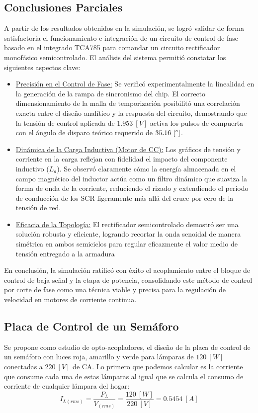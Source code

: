 \documentclass[12pt,a4paper]{article}
\begin{document}
\subsection{Conclusiones Parciales}
A partir de los resultados obtenidos en la simulación, se logró validar de forma satisfactoria el funcionamiento e integración de un circuito de control de fase basado en el integrado TCA785 para comandar un circuito rectificador monofásico semicontrolado. El análisis del sistema permitió constatar los siguientes aspectos clave:
\begin{itemize}
    \item \underline{Precisión en el Control de Fase:} Se verificó experimentalmente la linealidad en la generación de la rampa de sincronismo del chip. El correcto dimensionamiento de la malla de temporización posibilitó una correlación exacta entre el diseño analítico y la respuesta del circuito, demostrando que la tensión de control aplicada de $1.953 \ [V]$ activa los pulsos de compuerta con el ángulo de disparo teórico requerido de $35.16 \ [\degree]$.

    \item \underline{Dinámica de la Carga Inductiva (Motor de CC):} Los gráficos de tensión y corriente en la carga reflejan con fidelidad el impacto del componente inductivo ($L_a$). Se observó claramente cómo la energía almacenada en el campo magnético del inductor actúa como un filtro dinámico que suaviza la forma de onda de la corriente, reduciendo el rizado y extendiendo el periodo de conducción de los SCR ligeramente más allá del cruce por cero de la tensión de red.

    \item \underline{Eficacia de la Topología:} El rectificador semicontrolado demostró ser una solución robusta y eficiente, logrando recortar la onda senoidal de manera simétrica en ambos semiciclos para regular eficazmente el valor medio de tensión entregado a la armadura
\end{itemize}

En conclusión, la simulación ratificó con éxito el acoplamiento entre el bloque de control de baja señal y la etapa de potencia, consolidando este método de control por corte de fase como una técnica viable y precisa para la regulación de velocidad en motores de corriente continua.



\subsection{Placa de Control de un Semáforo}
Se propone como estudio de opto-acopladores, el diseño de la placa de control de un semáforo con luces roja, amarillo y verde para lámparas de $120 \ [W]$ conectadas a $220 \ [V]$ de CA. Lo primero que podemos calcular es la corriente que consume cada una de estas lámparas al igual que se calcula el consumo de corriente de cualquier lámpara del hogar:
\begin{equation}
    I_{L(rms)} = \frac{P_{L}}{V_{(rms)}} = \frac{120 \ [W]}{220 \ [V]} = 0.5454 \ [A]
    \label{eq_16}
\end{equation}
\end{document}
